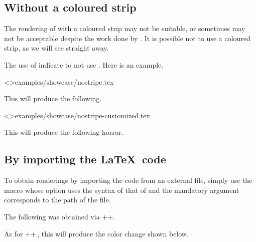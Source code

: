 



\subsection{Without a coloured strip}

The rendering of  with a coloured strip may not be suitable, or sometimes may not be acceptable despite the work done by .
It is possible not to use a coloured strip, as we will see straight away.


\begin{tdocexa}
    The use of  indicate to not use .
    Here is an example.

    \tdoclatexinput<>{examples/showcase/nostripe.tex}

    This will produce the following.

    \medskip

    

\end{tdocexa}




\begin{tdocexa}
    \leavevmode

    \tdoclatexinput<>{examples/showcase/nostripe-customized.tex}

    This will produce the following horror.

    \medskip

    

\end{tdocexa}


\subsection{By importing the \LaTeX\ code}

To obtain renderings by importing the code from an external file, simply use the  macro whose option uses the syntax of that of  and the mandatory argument corresponds to the path of the file.


\begin{tdocexa}
    The following was obtained via \tdoclatexin++.

    \medskip



    \medskip

    As for \tdoclatexin++\,, this will produce the color change shown below.

    \medskip


\end{tdocexa}


